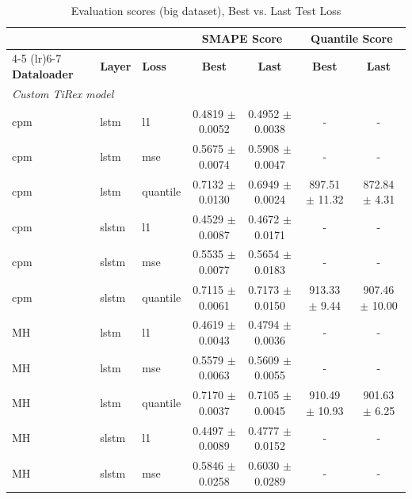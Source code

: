 \documentclass[a4paper,oneside,10pt,ngerman,english]{scrartcl}
\begin{document}
\begin{table}[htbp]
	\centering
	\begin{threeparttable}
		\caption{Evaluation scores (big dataset), Best vs. Last Test Loss}
		\label{tab:scores_custom_tirex_best_last}
		\setlength{\tabcolsep}{3pt}
		\begin{tabular}{lllcccc}
			\toprule
			& & & \multicolumn{2}{c}{\textbf{SMAPE Score}} & \multicolumn{2}{c}{\textbf{Quantile Score}} \\
			\cmidrule(lr){4-5} \cmidrule(lr){6-7}
			\textbf{Dataloader} & \textbf{Layer} & \textbf{Loss} & \textbf{Best} & \textbf{Last} & \textbf{Best} & \textbf{Last} \\
			\midrule
			\multicolumn{7}{l}{{\small \emph{Custom TiRex model}}}\\
			cpm & lstm & l1         & \cellcolor[HTML]{fdfebc}0.4819 $\pm$ 0.0052 & 0.4952 $\pm$ 0.0038 & -  & -  \\
			cpm & lstm & mse        & \cellcolor[HTML]{fdfebc}0.5675 $\pm$ 0.0074 & 0.5908 $\pm$ 0.0047 & -  & -  \\
			cpm & lstm & quantile   & 0.7132 $\pm$ 0.0130 & \cellcolor[HTML]{fdfebc}0.6949 $\pm$ 0.0024 & 897.51 $\pm$ 11.32 & \cellcolor[HTML]{fdfebc}872.84 $\pm$ 4.31 \\
			\addlinespace
			cpm & slstm & l1        & \cellcolor[HTML]{fdfebc}0.4529 $\pm$ 0.0087 & 0.4672 $\pm$ 0.0171 & -  & -  \\
			cpm & slstm & mse       & \cellcolor[HTML]{fdfebc}0.5535 $\pm$ 0.0077 & 0.5654 $\pm$ 0.0183 & -  & -  \\
			cpm & slstm & quantile  & \cellcolor[HTML]{fdfebc}0.7115 $\pm$ 0.0061 & 0.7173 $\pm$ 0.0150 & 913.33 $\pm$ 9.44 & \cellcolor[HTML]{fdfebc}907.46 $\pm$ 10.00 \\
			\addlinespace
			MH & lstm & l1       & \cellcolor[HTML]{fdfebc}0.4619 $\pm$ 0.0043 & 0.4794 $\pm$ 0.0036 & - & - \\
			MH & lstm & mse      & \cellcolor[HTML]{fdfebc}0.5579 $\pm$ 0.0063 & 0.5609 $\pm$ 0.0055 & -  & -  \\
			MH & lstm & quantile & 0.7170 $\pm$ 0.0037 & \cellcolor[HTML]{fdfebc}0.7105 $\pm$ 0.0045 & 910.49 $\pm$ 10.93 & \cellcolor[HTML]{fdfebc}901.63 $\pm$ 6.25 \\
			\addlinespace
			MH & slstm & l1      & \cellcolor[HTML]{fdfebc}0.4497 $\pm$ 0.0089 & 0.4777 $\pm$ 0.0152 & - & - \\
			MH & slstm & mse     & \cellcolor[HTML]{fdfebc}0.5846 $\pm$ 0.0258 & 0.6030 $\pm$ 0.0289 & - & - \\

\end{tabular}
\end{threeparttable}
\end{table}
\end{document}
